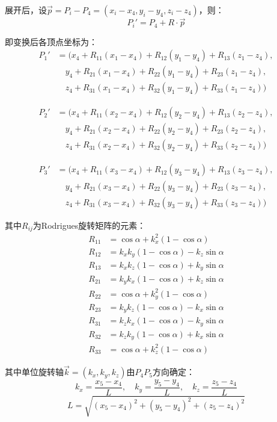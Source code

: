 \documentclass[12pt,a4paper]{article}
\begin{document}
展开后，设$\vec{p} = P_i - P_4 = (x_i-x_4, y_i-y_4, z_i-z_4)$，则：
\[
P_i' = P_4 + R \cdot \vec{p}
\]

即变换后各顶点坐标为：
\begin{align*}
P_1' &= (x_4 + R_{11}(x_1-x_4) + R_{12}(y_1-y_4) + R_{13}(z_1-z_4), \\
     &\quad y_4 + R_{21}(x_1-x_4) + R_{22}(y_1-y_4) + R_{23}(z_1-z_4), \\
     &\quad z_4 + R_{31}(x_1-x_4) + R_{32}(y_1-y_4) + R_{33}(z_1-z_4))
\end{align*}

\begin{align*}
P_2' &= (x_4 + R_{11}(x_2-x_4) + R_{12}(y_2-y_4) + R_{13}(z_2-z_4), \\
     &\quad y_4 + R_{21}(x_2-x_4) + R_{22}(y_2-y_4) + R_{23}(z_2-z_4), \\
     &\quad z_4 + R_{31}(x_2-x_4) + R_{32}(y_2-y_4) + R_{33}(z_2-z_4))
\end{align*}

\begin{align*}
P_3' &= (x_4 + R_{11}(x_3-x_4) + R_{12}(y_3-y_4) + R_{13}(z_3-z_4), \\
     &\quad y_4 + R_{21}(x_3-x_4) + R_{22}(y_3-y_4) + R_{23}(z_3-z_4), \\
     &\quad z_4 + R_{31}(x_3-x_4) + R_{32}(y_3-y_4) + R_{33}(z_3-z_4))
\end{align*}

其中$R_{ij}$为Rodrigues旋转矩阵的元素：
\begin{align*}
R_{11} &= \cos\alpha + k_x^2(1-\cos\alpha) \\
R_{12} &= k_xk_y(1-\cos\alpha) - k_z\sin\alpha \\
R_{13} &= k_xk_z(1-\cos\alpha) + k_y\sin\alpha \\
R_{21} &= k_yk_x(1-\cos\alpha) + k_z\sin\alpha \\
R_{22} &= \cos\alpha + k_y^2(1-\cos\alpha) \\
R_{23} &= k_yk_z(1-\cos\alpha) - k_x\sin\alpha \\
R_{31} &= k_zk_x(1-\cos\alpha) - k_y\sin\alpha \\
R_{32} &= k_zk_y(1-\cos\alpha) + k_x\sin\alpha \\
R_{33} &= \cos\alpha + k_z^2(1-\cos\alpha)
\end{align*}

其中单位旋转轴$\vec{k} = (k_x, k_y, k_z)$由$P_4P_5$方向确定：
\[
k_x = \frac{x_5-x_4}{L}, \quad k_y = \frac{y_5-y_4}{L}, \quad k_z = \frac{z_5-z_4}{L}
\]
\[
L = \sqrt{(x_5-x_4)^2 + (y_5-y_4)^2 + (z_5-z_4)^2}
\]
\end{document}
